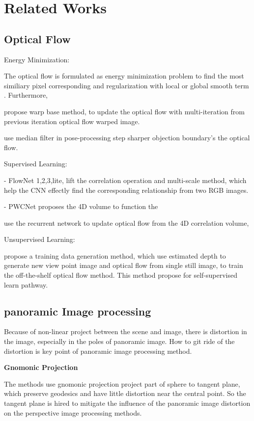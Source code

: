\section{Related Works}


\subsection{Optical Flow}

Energy Minimization:

The optical flow is formulated as energy minimization problem to find the most similiary pixel corresponding and regularization with local or global smooth term \cite{KroegTDV2016, HornS1981, BA}. Furthermore, 

\citet{BroxBPW2004} propose warp base method, to update the optical flow with multi-iteration from previous iteration optical flow warped image.

\cite{sun} use median filter in pose-processing step sharper objection boundary's the optical flow.

Supervised Learning:

- FlowNet 1,2,3,lite, lift the correlation operation and multi-scale method, which help the CNN effectly find the corresponding relationship from two RGB images. 

- PWCNet proposes the 4D volume to function the 

\citet{TeedD2020a} use the recurrent network to update optical flow from the 4D correlation volume, 

Unsupervised Learning:

\citet{AleotPM2021} propose a training data generation method, 
which use estimated depth to generate new view point image and optical flow from single still image, to train the off-the-shelf optical flow method.
This method propose for self-supervised learn pathway.

\subsection{panoramic Image processing}

Because of non-linear project between the scene and image, there is distortion in the image, especially in the poles of panoramic image.
How to git ride of the distortion is key point of panoramic image processing method. 

\textbf{Gnomonic Projection} ~\cite{gnomonicprojection}

The methods use gnomonic projection project part of sphere to tangent plane, which preserve geodesics and have little distortion near the central point.
So the tangent plane is hired to mitigate the influence of the panoramic image  distortion on the perspective image processing methods.

